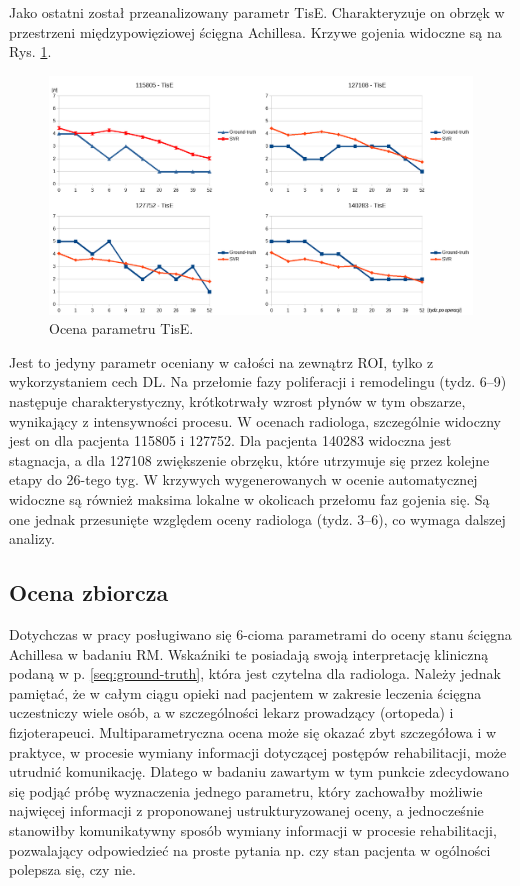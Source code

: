 Jako ostatni został przeanalizowany parametr TisE. Charakteryzuje on obrzęk \linebreak w przestrzeni międzypowięziowej ścięgna Achillesa. Krzywe gojenia widoczne \linebreak są na Rys. \ref{fig:TisE}.
\begin{figure}[h!]
	\centering
	\includegraphics[width=1\textwidth]{figures/TisE.png}
	\caption{Ocena parametru TisE.}\label{fig:TisE}
\end{figure}
Jest to jedyny parametr oceniany w całości na zewnątrz ROI, tylko z wykorzystaniem cech DL. Na przełomie fazy poliferacji i remodelingu (tydz. 6--9) następuje charakterystyczny, krótkotrwały wzrost płynów w tym obszarze, wynikający z intensywności procesu. W ocenach radiologa, szczególnie widoczny jest on dla pacjenta 115805 i 127752. Dla pacjenta 140283 widoczna jest stagnacja, \linebreak a dla 127108 zwiększenie obrzęku, które utrzymuje się przez kolejne etapy do 26-tego tyg. W krzywych wygenerowanych w ocenie automatycznej widoczne są również maksima lokalne w okolicach przełomu faz gojenia się. Są one jednak przesunięte względem oceny radiologa (tydz. 3--6), co wymaga dalszej analizy.

\subsection{Ocena zbiorcza}
\label{seq:achilles-score}
Dotychczas w pracy posługiwano się 6-cioma parametrami do oceny stanu ścięgna Achillesa w badaniu RM. Wskaźniki te posiadają swoją interpretację kliniczną podaną w p. \ref{seq:ground-truth}, która jest czytelna dla radiologa. Należy jednak pamiętać, że w całym ciągu opieki nad pacjentem w zakresie leczenia ścięgna uczestniczy wiele osób, a w szczególności lekarz prowadzący (ortopeda) i fizjoterapeuci. Multiparametryczna ocena może się okazać zbyt szczegółowa i w praktyce, w procesie wymiany informacji dotyczącej postępów rehabilitacji, może utrudnić komunikację. Dlatego w badaniu zawartym w tym punkcie zdecydowano się podjąć próbę wyznaczenia jednego parametru, który zachowałby możliwie najwięcej informacji z proponowanej ustrukturyzowanej oceny, a jednocześnie stanowiłby komunikatywny sposób wymiany informacji w procesie rehabilitacji, pozwalający odpowiedzieć na proste pytania np. czy stan pacjenta w ogólności polepsza się, czy nie. 

